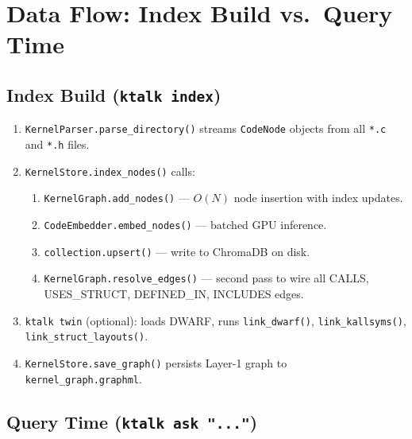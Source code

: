 \documentclass[11pt,a4paper]{article}
\newcommand{\coderef}[1]{\texttt{\small\color{layer2}#1}}
\begin{document}
\section{Data Flow: Index Build vs.\ Query Time}
\label{sec:dataflow}

\subsection{Index Build (\texttt{ktalk index})}

\begin{enumerate}[leftmargin=2em, itemsep=3pt]
  \item \coderef{KernelParser.parse\_directory()} streams \coderef{CodeNode}
        objects from all \texttt{*.c} and \texttt{*.h} files.
  \item \coderef{KernelStore.index\_nodes()} calls:
        \begin{enumerate}[leftmargin=1.5em, itemsep=1pt]
          \item \coderef{KernelGraph.add\_nodes()} --- $O(N)$ node insertion
                with index updates.
          \item \coderef{CodeEmbedder.embed\_nodes()} --- batched GPU inference.
          \item \texttt{collection.upsert()} --- write to ChromaDB on disk.
          \item \coderef{KernelGraph.resolve\_edges()} --- second pass to wire
                all CALLS, USES\_STRUCT, DEFINED\_IN, INCLUDES edges.
        \end{enumerate}
  \item \texttt{ktalk twin} (optional): loads DWARF, runs \texttt{link\_dwarf()},
        \texttt{link\_kallsyms()}, \texttt{link\_struct\_layouts()}.
  \item \coderef{KernelStore.save\_graph()} persists Layer-1 graph to
        \texttt{kernel\_graph.graphml}.
\end{enumerate}

\subsection{Query Time (\texttt{ktalk ask "..."})}
\end{document}
